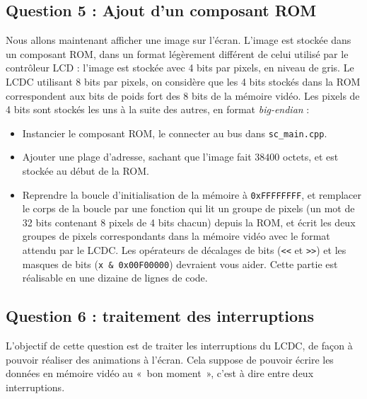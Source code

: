 \documentclass[12pt,a4paper]{article}
\begin{document}
\subsection*{Question 5 : Ajout d'un composant ROM}

Nous allons maintenant afficher une image sur l'écran.
L'image est stockée dans un composant ROM, dans un format légèrement différent de celui utilisé par le contrôleur LCD : l'image est stockée avec 4 bits par pixels, en niveau de gris.
Le LCDC utilisant 8 bits par pixels, on considère que les 4 bits stockés dans la ROM correspondent aux bits de poids fort des 8 bits de la mémoire vidéo.
Les pixels de 4 bits sont stockés les uns à la suite des autres, en format \textit{big-endian} :

\begin{center}
  \scalebox{.7}{
    
  }
\end{center}

\begin{itemize}
\item Instancier le composant ROM, le connecter au bus dans \lstinline|sc_main.cpp|.
\item Ajouter une plage d'adresse, sachant que l'image fait $38400$ octets, et est stockée au début de la ROM.
\item Reprendre la boucle d'initialisation de la mémoire à \verb|0xFFFFFFFF|, et remplacer le corps de la boucle par une fonction qui lit un groupe de pixels (un mot de 32 bits contenant 8 pixels de 4 bits chacun) depuis la ROM, et écrit les deux groupes de pixels correspondants dans la mémoire vidéo avec le format attendu par le LCDC.
   Les opérateurs de décalages de bits (\lstinline|<<| et \lstinline|>>|) et les masques de bits (\lstinline|x & 0x00F00000|) devraient vous aider.
      Cette partie est réalisable en une dizaine de lignes de code.
\end{itemize}


\subsection*{Question 6 : traitement des interruptions}

L'objectif de cette question est de traiter les interruptions du LCDC, de façon à pouvoir réaliser des animations à l'écran.
Cela suppose de pouvoir écrire les données en mémoire vidéo au «~bon moment~», c'est à dire entre deux interruptions.
\end{document}
